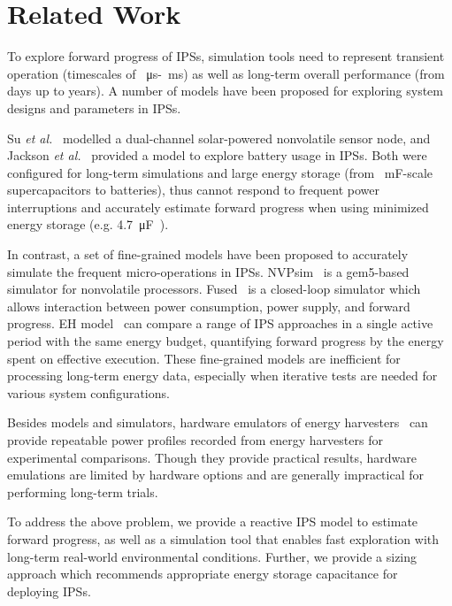 \section{Related Work} \label{sec:c4_review}

To explore forward progress of IPSs, simulation tools need to represent transient operation (timescales of \SI{}{\micro\second}-\SI{}{\milli\second}) as well as long-term overall performance (from days up to years). 
A number of models have been proposed for exploring system designs and parameters in IPSs.

Su \textit{et al.}~\cite{Su:2019:TFR:3340300.3320270} modelled a dual-channel solar-powered nonvolatile sensor node, and Jackson \textit{et al.}~\cite{Jackson:2019:COC:3302506.3310400} provided a model to explore battery usage in IPSs. 
Both were configured for long-term simulations and large energy storage (from \SI{}{\milli\farad}-scale supercapacitors to batteries), thus cannot respond to frequent power interruptions and accurately estimate forward progress when using minimized energy storage (e.g. \SI{4.7}{\micro\farad}~\cite{10.1145/3281300}).

In contrast, a set of fine-grained models have been proposed to accurately simulate the frequent micro-operations in IPSs. 
NVPsim~\cite{7428003} is a gem5-based simulator for nonvolatile processors.
Fused~\cite{sliper2020fused} is a closed-loop simulator which allows interaction between power consumption, power supply, and forward progress. 
EH model~\cite{8574572} can compare a range of IPS approaches in a single active period with the same energy budget, quantifying forward progress by the energy spent on effective execution. 
These fine-grained models are inefficient for processing long-term energy data, especially when iterative tests are needed for various system configurations. 

Besides models and simulators, hardware emulators of energy harvesters~\cite{10.1145/2668332.2668336, 10.1145/3356250.3360042} can provide repeatable power profiles recorded from energy harvesters for experimental comparisons. 
Though they provide practical results, hardware emulations are limited by hardware options and are generally impractical for performing long-term trials.

To address the above problem, we provide a reactive IPS model to estimate forward progress, as well as a simulation tool that enables fast exploration with long-term real-world environmental conditions. 
Further, we provide a sizing approach which recommends appropriate energy storage capacitance for deploying IPSs. 